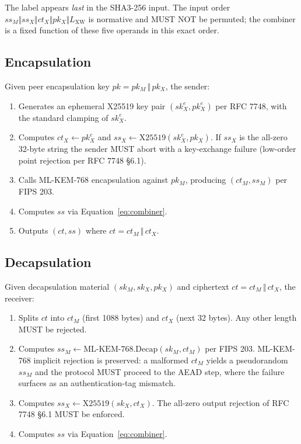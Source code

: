 \documentclass[11pt,a4paper]{article}
\begin{document}
The label appears \emph{last} in the SHA3-256 input. The input order
$ss_M \Vert ss_X \Vert ct_X \Vert pk_X \Vert L_{\mathrm{XW}}$ is normative
and MUST NOT be permuted; the combiner is a fixed function of these five
operands in this exact order.

\subsection{Encapsulation}

Given peer encapsulation key $pk = pk_M \,\Vert\, pk_X$, the sender:

\begin{enumerate}[leftmargin=*]
  \item Generates an ephemeral X25519 key pair $(sk_X^e, pk_X^e)$ per RFC 7748,
        with the standard clamping of $sk_X^e$.
  \item Computes $ct_X \leftarrow pk_X^e$ and
        $ss_X \leftarrow \mathrm{X25519}(sk_X^e, pk_X)$. If $ss_X$ is the
        all-zero 32-byte string the sender MUST abort with a key-exchange
        failure (low-order point rejection per RFC 7748 \S6.1).
  \item Calls ML-KEM-768 encapsulation against $pk_M$, producing
        $(ct_M, ss_M)$ per FIPS 203.
  \item Computes $ss$ via Equation~\ref{eq:combiner}.
  \item Outputs $(ct, ss)$ where $ct = ct_M \,\Vert\, ct_X$.
\end{enumerate}

\subsection{Decapsulation}

Given decapsulation material $(sk_M, sk_X, pk_X)$ and ciphertext
$ct = ct_M \,\Vert\, ct_X$, the receiver:

\begin{enumerate}[leftmargin=*]
  \item Splits $ct$ into $ct_M$ (first 1088 bytes) and $ct_X$
        (next 32 bytes). Any other length MUST be rejected.
  \item Computes $ss_M \leftarrow \mathrm{ML\text{-}KEM\text{-}768.Decap}(sk_M, ct_M)$
        per FIPS 203. ML-KEM-768 implicit rejection is preserved: a
        malformed $ct_M$ yields a pseudorandom $ss_M$ and the protocol
        MUST proceed to the AEAD step, where the failure surfaces as
        an authentication-tag mismatch.
  \item Computes $ss_X \leftarrow \mathrm{X25519}(sk_X, ct_X)$. The
        all-zero output rejection of RFC 7748 \S6.1 MUST be enforced.
  \item Computes $ss$ via Equation~\ref{eq:combiner}.
\end{enumerate}
\end{document}
